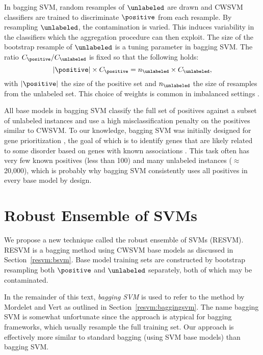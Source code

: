 In bagging SVM, random resamples of $\unlabeled$ are drawn and CWSVM classifiers are trained to discriminate $\positive$ from each resample. By resampling $\unlabeled$, the contamination is varied. This induces variability in the classifiers which the aggregation procedure can then exploit. The size of the bootstrap resample of $\unlabeled$ is a tuning parameter in bagging SVM. The ratio $C_{\positive}/C_{\unlabeled}$ is fixed so that the following holds:
\begin{equation}
|\positive| \times C_{\positive} = n_{\unlabeled} \times C_{\unlabeled}, \label{resvm:eq:bagpenalties}
\end{equation}
with $|\positive|$ the size of the positive set and $n_{\unlabeled}$ the size of resamples from the unlabeled set. This choice of weights is common in imbalanced settings \citep{cawley2006leave,daemen2009kernel}. 

All base models in bagging SVM classify the full set of positives against a subset of unlabeled instances and use a high misclassification penalty on the positives similar to CWSVM. To our knowledge, bagging SVM was initially designed for gene prioritization \citep{mordelet2011prodige}, the goal of which is to identify genes that are likely related to some disorder based on genes with known associations \citep{citeulike:615632, mordelet2011prodige}. This task often has very few known positives (less than 100) and many unlabeled instances ($\approx$ 20,000), which is probably why bagging SVM consistently uses all positives in every base model by design.




\section{Robust Ensemble of SVMs}

We propose a new technique called the robust ensemble of SVMs (RESVM). RESVM is a bagging method using CWSVM base models as discussed in Section~\ref{resvm:bsvm}. Base model training sets are constructed by bootstrap resampling both $\positive$ and $\unlabeled$ separately, both of which may be contaminated. 

In the remainder of this text, \emph{bagging SVM} is used to refer to the method by Mordelet and Vert \citep{mordelet2014bagging} as outlined in Section~\ref{resvm:baggingsvm}. The name bagging SVM is somewhat unfortunate since the approach is atypical for bagging frameworks, which usually resample the full training set. Our approach is effectively more similar to standard bagging (using SVM base models) than bagging SVM.


